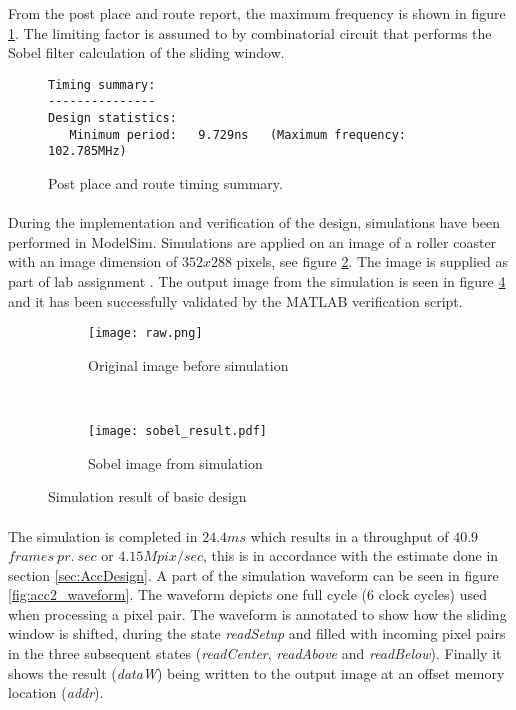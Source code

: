 From the post place and route report, the maximum frequency is shown in figure \ref{fig:sum_PostPAR_report}. The limiting factor is assumed to by combinatorial circuit that performs the Sobel filter calculation of the sliding window. 

\begin{figure}[H]
\centering
\small
\begin{BVerbatim}
Timing summary:
---------------
Design statistics:
   Minimum period:   9.729ns   (Maximum frequency: 102.785MHz)
\end{BVerbatim}
\caption{Post place and route timing summary.}
\label{fig:sum_PostPAR_report}
\end{figure}

\paragraph*{}
During the implementation and verification of the design, simulations have been performed in ModelSim. Simulations are applied on an image of a roller coaster with an image dimension of $352x288$ pixels, see figure \ref{fig:test_picture_raw}. The image is supplied as part of lab assignment \cite{Sparsoe2014}. The output image from the simulation is seen in figure \ref{fig:test_picture_sobel} and it has been successfully validated by the MATLAB verification script.

\begin{figure}[H]
	\centering
	\begin{subfigure}[b]{0.4\textwidth}
		\texttt{[image: raw.png]}
		\caption{Original image before simulation}
		\label{fig:test_picture_raw}
    \end{subfigure}%
        ~ %
    \begin{subfigure}[b]{0.4\textwidth}
    	\texttt{[image: sobel\_result.pdf]}
    	\caption{Sobel image from simulation}
    	\label{fig:test_picture_sobel}
	\end{subfigure}
	\caption{Simulation result of basic design}
\end{figure}

\paragraph*{}
The simulation is completed in $24.4ms$ which results in a throughput of $40.9$ $frames~pr.~sec$ or $4.15Mpix/sec$, this is in accordance with the estimate done in section \ref{sec:AccDesign}. A part of the simulation waveform can be seen in figure \ref{fig:acc2_waveform}. The waveform depicts one full cycle (6 clock cycles) used when processing a pixel pair. The waveform is annotated to show how the sliding window is shifted, during the state \emph{readSetup} and filled with incoming pixel pairs in the three subsequent states (\emph{readCenter}, \emph{readAbove} and \emph{readBelow}). Finally it shows the result (\emph{dataW}) being written to the output image at an offset memory location (\emph{addr}).

